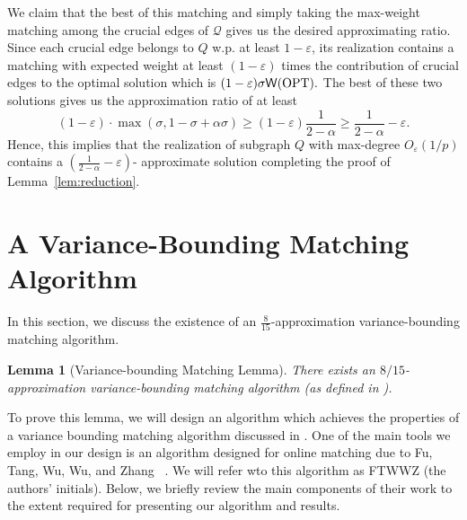 \documentclass[letterpaper,11pt]{article}
\renewcommand{\epsilon}{\varepsilon}
\newcommand{\mc}[1]{\ensuremath{\mathcal{#1}}}
\newcommand{\opt}[0]{\text{OPT}}
\newcommand{\weight}[0]{{\sf{W}}}
\renewcommand{\epsilon}[0]{\ensuremath{\varepsilon}}
\newtheorem{lemma}{Lemma}[section]
\renewcommand{\mc}[1]{\ensuremath{\mathcal{#1}}}
\begin{document}
We claim that the best of this matching  and simply taking the max-weight matching among the crucial edges of $\mc{Q}$ gives us the desired approximating ratio. Since each crucial edge belongs to $Q$ w.p. at least $1-\epsilon$, its realization contains a matching with expected weight at least $(1-\epsilon)$ times the contribution of crucial edges to the optimal solution which is $(1-\epsilon)\sigma\weight(\opt).$ The best of these two solutions gives us the approximation ratio of at least $$(1-\epsilon)\cdot\max(\sigma, 1-\sigma+\alpha\sigma)\geq (1-\epsilon)\frac{1}{2-\alpha}\geq \frac{1}{2-\alpha}-\epsilon.$$
Hence, this implies that the realization of subgraph $Q$ with max-degree $O_{\epsilon}(1/p)$ contains a $(\frac{1}{2-\alpha}-\epsilon)$- approximate solution completing the proof of Lemma~\ref{lem:reduction}. 
 \section{A Variance-Bounding Matching Algorithm}\label{secvariancebounding}
In this section, we discuss the existence of an $\frac{8}{15}$-approximation variance-bounding matching algorithm.
\begin{lemma}[Variance-bounding Matching Lemma]\label{lem:vertexindependent}
There exists an $8/15$-approximation variance-bounding matching algorithm (as defined in ).
\end{lemma}

To prove this lemma, we will design  an algorithm which achieves the properties of a variance bounding matching algorithm discussed in .
One of the main tools we employ in our design  is an algorithm designed for online matching due to Fu, Tang, Wu, Wu, and Zhang ~\cite{Fu}. We will refer wto this algorithm as FTWWZ (the authors' initials). Below, we briefly review the main components of their work to the extent required for presenting our algorithm and results.
\end{document}

